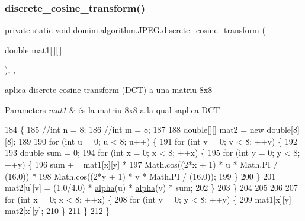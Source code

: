 \subsubsection{\texorpdfstring{discrete\+\_\+cosine\+\_\+transform()}{discrete\_cosine\_transform()}}
{\footnotesize\ttfamily private static void domini.\+algorithm.\+J\+P\+E\+G.\+discrete\+\_\+cosine\+\_\+transform (\begin{DoxyParamCaption}\item[{double}]{mat1\mbox{[}$\,$\mbox{]}\mbox{[}$\,$\mbox{]} }\end{DoxyParamCaption})\hspace{0.3cm}{\ttfamily [inline]}, {\ttfamily [static]}, {\ttfamily [private]}}



aplica discrete cosine transform (D\+CT) a una matriu 8x8 


\begin{DoxyParams}{Parameters}
{\em mat1} & és la matriu 8x8 a la qual s\textquotesingle{}aplica D\+CT \\
\hline
\end{DoxyParams}

\begin{DoxyCode}
184                                                                    \{
185         \textcolor{comment}{//int n = 8;}
186         \textcolor{comment}{//int m = 8;}
187         
188         \textcolor{keywordtype}{double}[][] mat2 = \textcolor{keyword}{new} \textcolor{keywordtype}{double}[8][8];
189 
190         \textcolor{keywordflow}{for} (\textcolor{keywordtype}{int} u = 0; u < 8; u++) \{
191             \textcolor{keywordflow}{for} (\textcolor{keywordtype}{int} v = 0; v < 8; ++v) \{
192 
193                 \textcolor{keywordtype}{double} sum = 0;
194                 \textcolor{keywordflow}{for} (\textcolor{keywordtype}{int} x = 0; x < 8; ++x) \{ 
195                     \textcolor{keywordflow}{for} (\textcolor{keywordtype}{int} y = 0; y < 8; ++y)  \{ 
196                         sum += mat1[x][y] *  
197                                Math.cos((2*x + 1) * u * Math.PI / (16.0)) *  
198                                Math.cos((2*y + 1) * v * Math.PI / (16.0)); 
199                     \} 
200                 \}
201                 mat2[u][v] = (1.0/4.0) * \hyperlink{classdomini_1_1algorithm_1_1JPEG_a058b0ee7eb44bbaec4078b5fc32c5107}{alpha}(u) * \hyperlink{classdomini_1_1algorithm_1_1JPEG_a058b0ee7eb44bbaec4078b5fc32c5107}{alpha}(v) * sum;
202             \}
203         \}
204 
205         
206 
207         \textcolor{keywordflow}{for} (\textcolor{keywordtype}{int} x = 0; x < 8; ++x) \{
208             \textcolor{keywordflow}{for} (\textcolor{keywordtype}{int} y = 0; y < 8; ++y) \{ 
209                 mat1[x][y] = mat2[x][y];
210             \}
211         \}
212     \}
\end{DoxyCode}
\mbox{\label{classdomini_1_1algorithm_1_1JPEG_af86bdbb6b6f5671abff6bc6bd5f6349d}} 
